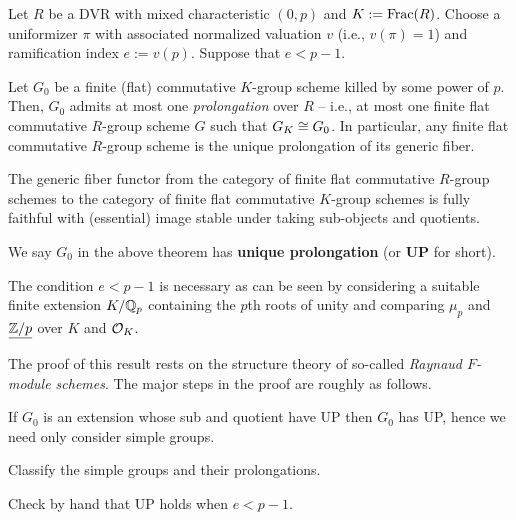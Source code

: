 \documentclass[11pt]{article}
\begin{document}
\begin{theorem}[Raynaud]
Let $R$ be a DVR with mixed characteristic $(0,p)$ and $K:=\operatorname{Frac}(R)$. Choose a uniformizer $\pi$ with associated normalized valuation $v$ (i.e., $v(\pi)=1$) and ramification index $e:=v(p)$. Suppose that $e<p-1$.
\begin{enum}{\alph}
\item Let $G_0$ be a finite (flat) commutative $K$-group scheme killed by some power of $p$. Then, $G_0$ admits at most one \emph{prolongation} over $R$ -- i.e., at most one finite flat commutative $R$-group scheme $G$ such that $G_K\cong G_0$. In particular, any finite flat commutative $R$-group scheme is the unique prolongation of its generic fiber.

\item The generic fiber functor from the category of finite flat commutative $R$-group schemes to the category of finite flat commutative $K$-group schemes is fully faithful with (essential) image stable under taking sub-objects and quotients.
\end{enum}
\end{theorem}

We say $G_0$ in the above theorem has \textbf{unique prolongation} (or \textbf{UP} for short).

\begin{remark}
The condition $e<p-1$ is necessary as can be seen by considering a suitable finite extension $K/\mathbb{Q}_p$ containing the $p$th roots of unity and comparing $\mu_p$ and $\underline{\mathbb{Z}/p}$ over $K$ and $\mathcal{O}_K$.
\end{remark}

The proof of this result rests on the structure theory of so-called \emph{Raynaud $F$-module schemes}. The major steps in the proof are roughly as follows.
\begin{enum}{\arabic}
\item If $G_0$ is an extension whose sub and quotient have UP then $G_0$ has UP, hence we need only consider simple groups.
\item Classify the simple groups and their prolongations.
\item Check by hand that UP holds when $e<p-1$.
\end{enum}
\end{document}
